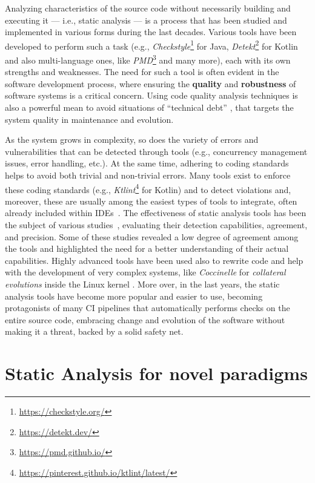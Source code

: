 \documentclass[12pt,a4paper,openright,twoside]{book}
\begin{document}
Analyzing characteristics of the source code without necessarily building and
executing it --- i.e., static analysis --- is a process that has been studied
and implemented in various forms during the last decades. Various tools have
been developed to perform such a task (e.g.,
\emph{Checkstyle}\footnote{\url{https://checkstyle.org/}} for Java,
\emph{Detekt}\footnote{\url{https://detekt.dev/}} for Kotlin and also
multi-language ones, like \emph{PMD}\footnote{\url{https://pmd.github.io/}} and
many more), each with its own strengths and weaknesses.
%
The need for such a tool is often evident in the software development process,
where ensuring the \textbf{quality} and \textbf{robustness} of software systems
is a critical concern. Using code quality analysis techniques is also a powerful
mean to avoid situations of ``technical debt''
\cite{DBLP:conf/sigsoft/ErnstBONG15}, that targets the system quality in
maintenance and evolution.

As the system grows in complexity, so does the variety of errors and
vulnerabilities that can be detected through tools (e.g., concurrency management
issues, error handling, etc.). At the same time, adhering to coding standards
helps to avoid both trivial and non-trivial errors. Many tools exist to enforce
these coding standards (e.g.,
\emph{Ktlint}\footnote{\url{https://pinterest.github.io/ktlint/latest/}} for
Kotlin) and to detect violations and, moreover, these are usually among the
easiest types of tools to integrate, often already included within
\acp{IDE}~\cite{DBLP:journals/queue/Thomson21}.
%
The effectiveness of static analysis tools has been the subject of various
studies~\cite{DBLP:journals/jss/LenarduzziPSLP23}, evaluating their detection
capabilities, agreement, and precision. Some of these studies revealed a low
degree of agreement among the tools and highlighted the need for a better
understanding of their actual capabilities. Highly advanced tools have been used
also to rewrite code and help with the development of very complex systems, like
\emph{Coccinelle} for \emph{collateral evolutions} inside the Linux kernel
\cite{DBLP:conf/eurosys/PadioleauLHM08}.
%
More over, in the last years, the static analysis tools have become more popular
and easier to use, becoming protagonists of many \ac{CI} pipelines
\cite{DBLP:conf/msr/ZampettiSOCP17} that automatically performs checks on the
entire source code, embracing change and evolution of the software without
making it a threat, backed by a solid safety net. 

\section{Static Analysis for novel paradigms}
\end{document}
